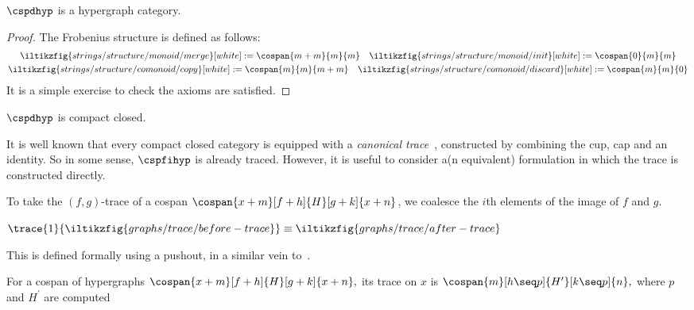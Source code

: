 \begin{proposition}
    \(\cspdhyp\) is a hypergraph category.
\end{proposition}
\begin{proof}
    The Frobenius structure is defined as follows:
    \begin{gather*}
        \iltikzfig{strings/structure/monoid/merge}[white]
        :=
        \cospan{m + m}{m}{m}
        \quad
        \iltikzfig{strings/structure/monoid/init}[white]
        :=
        \cospan{0}{m}{m}
        \\
        \iltikzfig{strings/structure/comonoid/copy}[white]
        :=
        \cospan{m}{m}{m+m}
        \quad
        \iltikzfig{strings/structure/comonoid/discard}[white]
        :=
        \cospan{m}{m}{0}
    \end{gather*}
    It is a simple exercise to check the axioms are satisfied.
\end{proof}

\begin{corollary}
    \(\cspdhyp\) is compact closed.
\end{corollary}

It is well known that every compact closed category is equipped with a
\emph{canonical trace}~\cite{joyal1996traced}, constructed by combining the cup,
cap and an identity.
So in some sense, \(\cspfihyp\) is already traced.
However, it is useful to consider a(n equivalent) formulation in which the trace
is constructed directly.

To take the \((f,g)\)-trace of a cospan \(\cospan{x+m}[f+h]{H}[g+k]{x+n}\), we
coalesce the \(i\)th elements of the image of \(f\) and \(g\).
\begin{center}
    \(
        \trace{1}{\iltikzfig{graphs/trace/before-trace}}
        \equiv
        \iltikzfig{graphs/trace/after-trace}
    \)
\end{center}
This is defined formally using a pushout, in a similar vein
to~\cite{dixon2013opengraphs}.

\begin{definition}
    For a cospan of hypergraphs \(
        \cospan{x+m}[f+h]{H}[g+k]{x+n},
    \) its trace on \(x\) is \(
        \cospan{m}[h \seq p]{H^\prime}[k \seq p]{n},
    \) where \(p\) and \(H^\prime\) are computed%
    \iftoggle{conf}{
        as the pushout of \(f + h\) and \([\id, \id]\).
    }{
        by the following pushout:
        \begin{center}
            \tikzfig{graphs/trace/trace-pushout}
        \end{center}
    }
\end{definition}


